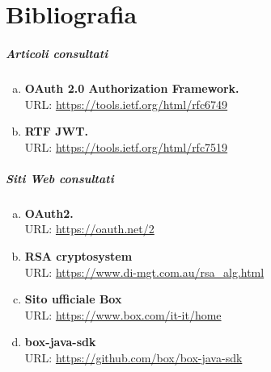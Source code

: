 

\cleardoublepage
\chapter{Bibliografia}

\paragraph{\Large{Articoli consultati}}\mbox{}

\begin{enumerate}[a.]
	\item \textbf{OAuth 2.0 Authorization Framework.}\\
	URL: \url{https://tools.ietf.org/html/rfc6749}
	\item \textbf{RTF JWT.}\\
	URL: \url{https://tools.ietf.org/html/rfc7519}
\end{enumerate}

\bigskip

\paragraph{\Large{Siti Web consultati}}\mbox{}

\begin{enumerate}[a.]
	\item \textbf{OAuth2.}\\
	URL: \url{https://oauth.net/2}
	\item \textbf{RSA cryptosystem}\\
	URL: \url{https://www.di-mgt.com.au/rsa_alg.html}
	\item \textbf{Sito ufficiale Box}\\
	URL: \url{https://www.box.com/it-it/home}
	\item \textbf{box-java-sdk}\\
	URL: \url{https://github.com/box/box-java-sdk}	
\end{enumerate}